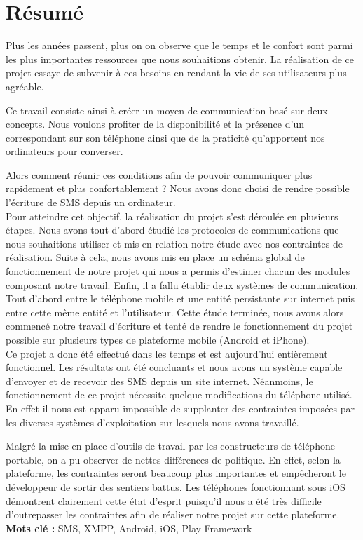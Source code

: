 \cleardoublepage



\chapter*{Résumé}

\thispagestyle{empty}



Plus les années passent, plus on on observe que le temps et le confort sont parmi
les plus importantes ressources que nous souhaitions obtenir. La réalisation de ce
projet essaye de subvenir à ces besoins en rendant la vie de ses utilisateurs plus agréable.

Ce travail consiste ainsi à créer un moyen de communication basé sur deux concepts.
Nous voulons profiter de la disponibilité et la présence d'un correspondant sur son 
téléphone ainsi que de la praticité qu'apportent nos ordinateurs pour converser.

Alors comment réunir ces conditions afin de pouvoir communiquer plus rapidement et plus confortablement ?
Nous avons donc choisi de rendre possible l'écriture de SMS depuis un ordinateur.
\\


Pour atteindre cet objectif, la réalisation du projet s'est déroulée en plusieurs étapes.
Nous avons tout d'abord étudié les protocoles de communications que nous souhaitions utiliser
et mis en relation notre étude avec nos contraintes de réalisation. Suite à cela, nous avons
mis en place un schéma global de fonctionnement de notre projet qui nous a permis d'estimer
chacun des modules composant notre travail. Enfin, il a fallu établir deux systèmes de communication.
Tout d'abord entre le téléphone mobile et une entité persistante sur internet puis entre
cette même entité et l'utilisateur. Cette étude terminée, nous avons alors commencé notre
travail d'écriture et tenté de rendre le fonctionnement du projet possible sur plusieurs
types de plateforme mobile (Android et iPhone).
\\


Ce projet a donc été effectué dans les temps et est aujourd'hui entièrement fonctionnel.
Les résultats ont été concluants et nous avons un système capable d'envoyer et de recevoir
des SMS depuis un site internet. Néanmoins, le fonctionnement de ce projet nécessite quelque 
modifications du téléphone utilisé. En effet il nous est apparu impossible de supplanter
des contraintes imposées par les diverses systèmes d'exploitation sur lesquels nous avons travaillé.

Malgré la mise en place d'outils de travail par les constructeurs de téléphone portable,
on a pu observer de nettes différences de politique. En effet, selon la plateforme, les contraintes
seront beaucoup plus importantes et empêcheront le développeur de sortir des sentiers battus. 
Les téléphones fonctionnant sous iOS démontrent clairement cette état d'esprit puisqu'il 
nous a été très difficile d'outrepasser les contraintes afin de réaliser notre projet sur cette plateforme.
\\



\textbf{Mots clé : } SMS, XMPP, Android, iOS, Play Framework
